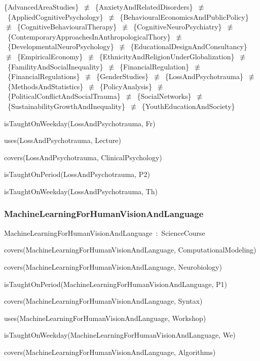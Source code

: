 \documentclass{article}
\begin{document}
\{AdvancedAreaStudies\}~\ensuremath{\not\equiv}~\{AnxietyAndRelatedDisorders\}~\ensuremath{\not\equiv}~\{AppliedCognitivePsychology\}~\ensuremath{\not\equiv}~\{BehaviouralEconomicsAndPublicPolicy\}~\ensuremath{\not\equiv}~\{CognitiveBehaviouralTherapy\}~\ensuremath{\not\equiv}~\{CognitiveNeuroPsychiatry\}~\ensuremath{\not\equiv}~\{ContemporaryApproachesInAnthropologicalThory\}~\ensuremath{\not\equiv}~\{DevelopmentalNeuroPsychology\}~\ensuremath{\not\equiv}~\{EducationalDesignAndConsultancy\}~\ensuremath{\not\equiv}~\{EmpiricalEconomy\}~\ensuremath{\not\equiv}~\{EthnicityAndReligionUnderGlobalization\}~\ensuremath{\not\equiv}~\{FamilityAndSocialInequality\}~\ensuremath{\not\equiv}~\{FinancialRegulation\}~\ensuremath{\not\equiv}~\{FinancialRegulations\}~\ensuremath{\not\equiv}~\{GenderStudies\}~\ensuremath{\not\equiv}~\{LossAndPsychotrauma\}~\ensuremath{\not\equiv}~\{MethodsAndStatistics\}~\ensuremath{\not\equiv}~\{PolicyAnalysis\}~\ensuremath{\not\equiv}~\{PoliticalConflictAndSocialTrauma\}~\ensuremath{\not\equiv}~\{SocialNetworks\}~\ensuremath{\not\equiv}~\{SustainabilityGrowthAndInequality\}~\ensuremath{\not\equiv}~\{YouthEducationAndSociety\}

isTaughtOnWeekday(LossAndPsychotrauma, Fr)

uses(LossAndPsychotrauma, Lecture)

covers(LossAndPsychotrauma, ClinicalPsychology)

isTaughtOnPeriod(LossAndPsychotrauma, P2)

isTaughtOnWeekday(LossAndPsychotrauma, Th)

\subsubsection*{MachineLearningForHumanVisionAndLanguage}

MachineLearningForHumanVisionAndLanguage~:~ScienceCourse

covers(MachineLearningForHumanVisionAndLanguage, ComputationalModeling)

covers(MachineLearningForHumanVisionAndLanguage, Neurobiology)

isTaughtOnPeriod(MachineLearningForHumanVisionAndLanguage, P1)

covers(MachineLearningForHumanVisionAndLanguage, Syntax)

uses(MachineLearningForHumanVisionAndLanguage, Workshop)

isTaughtOnWeekday(MachineLearningForHumanVisionAndLanguage, We)

covers(MachineLearningForHumanVisionAndLanguage, Algorithms)
\end{document}
